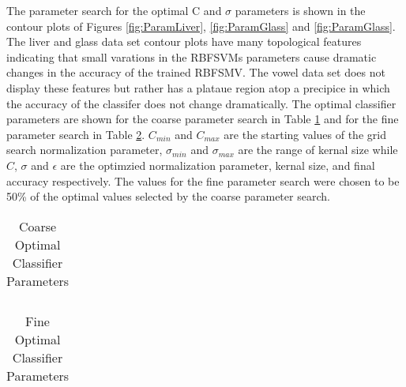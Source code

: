 The parameter search for the optimal C and $\sigma$ parameters is shown in the contour plots of Figures \ref{fig:ParamLiver}, \ref{fig:ParamGlass} and \ref{fig:ParamGlass}.
The liver and glass data set contour plots have many topological features indicating that small varations in the RBFSVMs parameters cause dramatic changes in the accuracy of the trained RBFSMV.
The vowel data set does not display these features but rather has a plataue region atop a precipice in which the accuracy of the classifer does not change dramatically.
The optimal classifier parameters are shown for the coarse parameter search in Table \ref{tab:CoarseParamValues} and for the fine parameter search in Table \ref{tab:FineParamValues}. $C_{min}$ and $C_{max}$ are the starting values of the grid search normalization parameter, $\sigma_{min}$ and $\sigma_{max}$ are the range of kernal size while $C$, $\sigma$ and $\epsilon$ are the optimzied normalization parameter, kernal size, and final accuracy respectively.
The values for the fine parameter search were chosen to be 50\% of the optimal values selected by the coarse parameter search.
\begin{table}[h!]
\caption{Coarse Optimal Classifier Parameters}
\label{tab:CoarseParamValues}
\centering
\begin{tabular}{c c c c c c c c}
\hline

\hline
\end{tabular}
\end{table}
\begin{table}[!ht]
\caption{Fine Optimal Classifier Parameters}
\label{tab:FineParamValues}
\centering
\begin{tabular}{c c c c c c c c}
\hline

\hline
\end{tabular}
\end{table}
